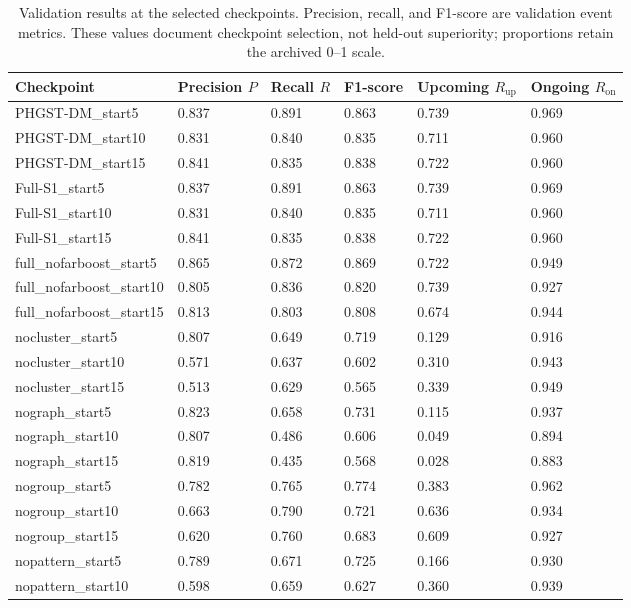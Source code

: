 \begin{table}[htbp]
\centering
\scriptsize
\caption{Validation results at the selected checkpoints. Precision, recall, and F1-score are validation event metrics. These values document checkpoint selection, not held-out superiority; proportions retain the archived 0--1 scale.}
\label{tab:checkpoint-validation-event}
\begin{tabularx}{\textwidth}{@{}lXXXXX@{}}
\toprule
Checkpoint & Precision $P$ & Recall $R$ & F1-score & Upcoming $R_{\mathrm{up}}$ & Ongoing $R_{\mathrm{on}}$ \\
\midrule
PHGST-DM\_start5 & 0.837 & 0.891 & 0.863 & 0.739 & 0.969 \\
PHGST-DM\_start10 & 0.831 & 0.840 & 0.835 & 0.711 & 0.960 \\
PHGST-DM\_start15 & 0.841 & 0.835 & 0.838 & 0.722 & 0.960 \\
Full-S1\_start5 & 0.837 & 0.891 & 0.863 & 0.739 & 0.969 \\
Full-S1\_start10 & 0.831 & 0.840 & 0.835 & 0.711 & 0.960 \\
Full-S1\_start15 & 0.841 & 0.835 & 0.838 & 0.722 & 0.960 \\
full\_nofarboost\_start5 & 0.865 & 0.872 & 0.869 & 0.722 & 0.949 \\
full\_nofarboost\_start10 & 0.805 & 0.836 & 0.820 & 0.739 & 0.927 \\
full\_nofarboost\_start15 & 0.813 & 0.803 & 0.808 & 0.674 & 0.944 \\
nocluster\_start5 & 0.807 & 0.649 & 0.719 & 0.129 & 0.916 \\
nocluster\_start10 & 0.571 & 0.637 & 0.602 & 0.310 & 0.943 \\
nocluster\_start15 & 0.513 & 0.629 & 0.565 & 0.339 & 0.949 \\
nograph\_start5 & 0.823 & 0.658 & 0.731 & 0.115 & 0.937 \\
nograph\_start10 & 0.807 & 0.486 & 0.606 & 0.049 & 0.894 \\
nograph\_start15 & 0.819 & 0.435 & 0.568 & 0.028 & 0.883 \\
nogroup\_start5 & 0.782 & 0.765 & 0.774 & 0.383 & 0.962 \\
nogroup\_start10 & 0.663 & 0.790 & 0.721 & 0.636 & 0.934 \\
nogroup\_start15 & 0.620 & 0.760 & 0.683 & 0.609 & 0.927 \\
nopattern\_start5 & 0.789 & 0.671 & 0.725 & 0.166 & 0.930 \\
nopattern\_start10 & 0.598 & 0.659 & 0.627 & 0.360 & 0.939 \\

\end{tabularx}
\end{table}
